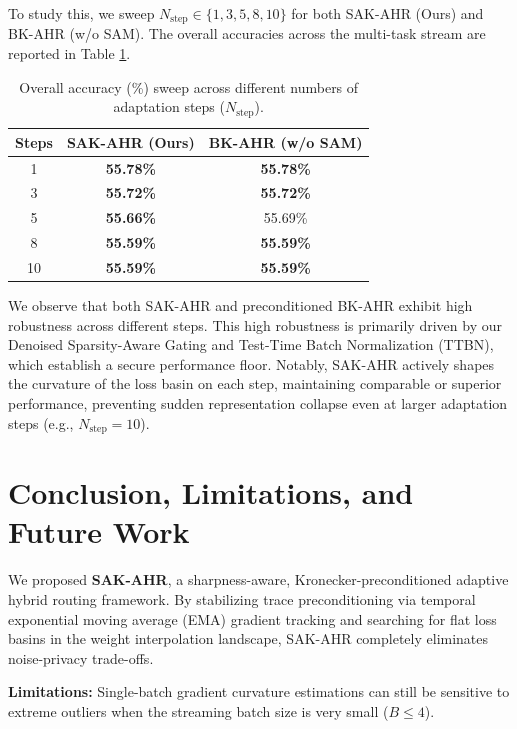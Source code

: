 \documentclass{article}
\theoremstyle{plain}
\theoremstyle{definition}
\theoremstyle{remark}
\begin{document}
To study this, we sweep $N_{\text{step}} \in \{1, 3, 5, 8, 10\}$ for both SAK-AHR (Ours) and BK-AHR (w/o SAM). The overall accuracies across the multi-task stream are reported in Table \ref{tab:steps_sweep}.

\begin{table}[h]
\caption{Overall accuracy (\%) sweep across different numbers of adaptation steps ($N_{\text{step}}$).}
\label{tab:steps_sweep}
\vskip 0.15in
\begin{center}
\begin{small}
\begin{tabular}{ccc}
\toprule
Steps & SAK-AHR (Ours) & BK-AHR (w/o SAM) \\
\midrule
1 & \textbf{55.78\%} & \textbf{55.78\%} \\
3 & \textbf{55.72\%} & \textbf{55.72\%} \\
5 & \textbf{55.66\%} & 55.69\% \\
8 & \textbf{55.59\%} & \textbf{55.59\%} \\
10 & \textbf{55.59\%} & \textbf{55.59\%} \\
\bottomrule
\end{tabular}
\end{small}
\end{center}
\vskip -0.1in
\end{table}

We observe that both SAK-AHR and preconditioned BK-AHR exhibit high robustness across different steps. This high robustness is primarily driven by our Denoised Sparsity-Aware Gating and Test-Time Batch Normalization (TTBN), which establish a secure performance floor. Notably, SAK-AHR actively shapes the curvature of the loss basin on each step, maintaining comparable or superior performance, preventing sudden representation collapse even at larger adaptation steps (e.g., $N_{\text{step}} = 10$).

\section{Conclusion, Limitations, and Future Work}
\label{sec:conclusion}
We proposed \textbf{SAK-AHR}, a sharpness-aware, Kronecker-preconditioned adaptive hybrid routing framework. By stabilizing trace preconditioning via temporal exponential moving average (EMA) gradient tracking and searching for flat loss basins in the weight interpolation landscape, SAK-AHR completely eliminates noise-privacy trade-offs.

\textbf{Limitations:} Single-batch gradient curvature estimations can still be sensitive to extreme outliers when the streaming batch size is very small ($B \le 4$).
\end{document}
